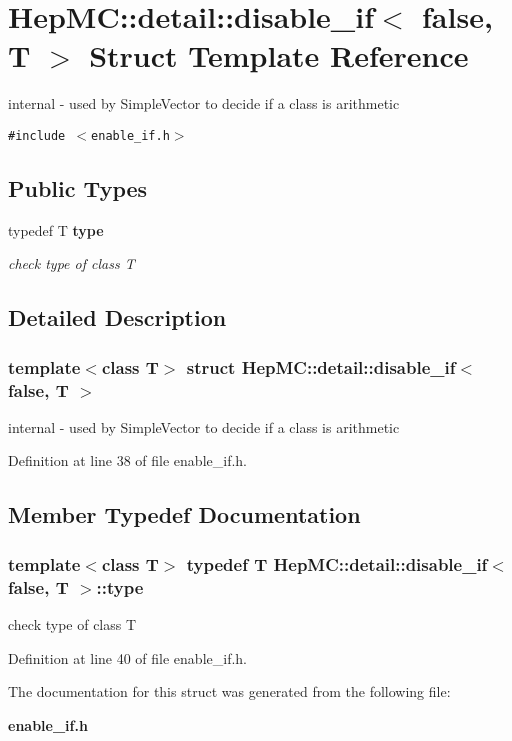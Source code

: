 \section{Hep\-MC::detail::disable\_\-if$<$ false, T $>$ Struct Template Reference}
\label{structHepMC_1_1detail_1_1disable__if_3_01false_00_01T_01_4}
internal - used by Simple\-Vector to decide if a class is arithmetic  


{\tt \#include $<$enable\_\-if.h$>$}

\subsection*{Public Types}
\begin{CompactItemize}
\item 
typedef T {\bf type}
\begin{CompactList}\small\item\em check type of class T \item\end{CompactList}\end{CompactItemize}


\subsection{Detailed Description}
\subsubsection*{template$<$class T$>$ struct Hep\-MC::detail::disable\_\-if$<$ false, T $>$}

internal - used by Simple\-Vector to decide if a class is arithmetic 



Definition at line 38 of file enable\_\-if.h.

\subsection{Member Typedef Documentation}
\subsubsection{\setlength{\rightskip}{0pt plus 5cm}template$<$class T$>$ typedef T {\bf Hep\-MC::detail::disable\_\-if}$<$ false, T $>$::{\bf type}}\label{structHepMC_1_1detail_1_1disable__if_3_01false_00_01T_01_4_14bd1496d5e5694449fc4f6ddd6e52e4}


check type of class T 



Definition at line 40 of file enable\_\-if.h.

The documentation for this struct was generated from the following file:\begin{CompactItemize}
\item 
{\bf enable\_\-if.h}\end{CompactItemize}
